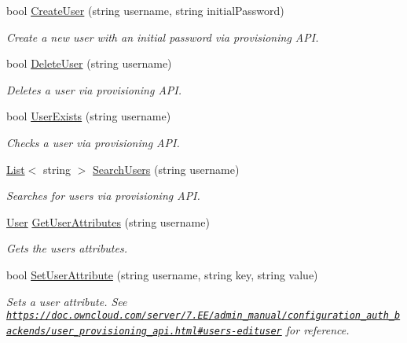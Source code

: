 \begin{DoxyCompactItemize}
bool \hyperlink{classowncloudsharp_1_1_client_a7e285455e3f0cf437d9359956b6feaa5}{Create\+User} (string username, string initial\+Password)
\begin{DoxyCompactList}\small\item\em Create a new user with an initial password via provisioning A\+P\+I. \end{DoxyCompactList}\item 
bool \hyperlink{classowncloudsharp_1_1_client_a0603de03c323c55dc53cea24516ecf31}{Delete\+User} (string username)
\begin{DoxyCompactList}\small\item\em Deletes a user via provisioning A\+P\+I. \end{DoxyCompactList}\item 
bool \hyperlink{classowncloudsharp_1_1_client_a59adb4a3ad62adbaad112c1a6fa8201e}{User\+Exists} (string username)
\begin{DoxyCompactList}\small\item\em Checks a user via provisioning A\+P\+I. \end{DoxyCompactList}\item 
\hyperlink{classowncloudsharp_1_1_client_a914c144ebbe207958829523f7eda3609}{List}$<$ string $>$ \hyperlink{classowncloudsharp_1_1_client_ae50362f45f53ffe21fde6651f0873c0e}{Search\+Users} (string username)
\begin{DoxyCompactList}\small\item\em Searches for users via provisioning A\+P\+I. \end{DoxyCompactList}\item 
\hyperlink{classowncloudsharp_1_1_types_1_1_user}{User} \hyperlink{classowncloudsharp_1_1_client_ad3907603f1510c65ec3de52897257457}{Get\+User\+Attributes} (string username)
\begin{DoxyCompactList}\small\item\em Gets the user\textquotesingle{}s attributes. \end{DoxyCompactList}\item 
bool \hyperlink{classowncloudsharp_1_1_client_a788f66e2d774a7c47e0a46918a50c5b5}{Set\+User\+Attribute} (string username, string key, string value)
\begin{DoxyCompactList}\small\item\em Sets a user attribute. See \href{https://doc.owncloud.com/server/7.0EE/admin_manual/configuration_auth_backends/user_provisioning_api.html#users-edituser}{\tt https\+://doc.\+owncloud.\+com/server/7.\+E\+E/admin\+\_\+manual/configuration\+\_\+auth\+\_\+backends/user\+\_\+provisioning\+\_\+api.\+html\#users-\/edituser} for reference. \end{DoxyCompactList}\item 

\end{DoxyCompactItemize}
